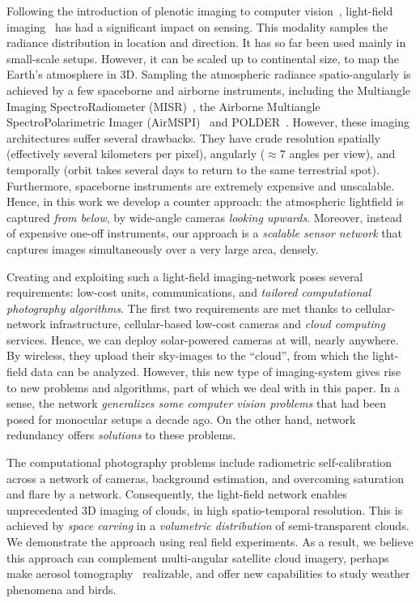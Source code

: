 \documentclass[runningheads]{llncs}
\begin{document}
Following the introduction of plenotic imaging to computer vision~\cite{Adelson1992}, light-field imaging~\cite{Basha2012,bishop,horstmeyer,Ng1948,kim} has had a significant impact on sensing. This modality samples the radiance distribution in location and direction. It has so far been used mainly in small-scale setups. However, it can be scaled up to continental size, to map the Earth's atmosphere in 3D. Sampling the atmospheric radiance spatio-angularly is achieved by a few spaceborne and airborne instruments, including the Multiangle Imaging SpectroRadiometer (MISR)~\cite{diner,Diner1998}, the Airborne Multiangle SpectroPolarimetric Imager (AirMSPI)~\cite{dinerDavis07,dinerDavis10} and POLDER~\cite{baxter,breon,vanMol}.
However, these imaging architectures suffer several drawbacks. They have crude resolution spatially (effectively several kilometers per pixel), angularly  ($\approx 7$ angles per view), and temporally (orbit takes several days to return to the same terrestrial spot). Furthermore, spaceborne instruments are extremely expensive and unscalable. Hence, in this work we develop a counter approach: the atmospheric lightfield is captured {\em from below}, by wide-angle cameras {\em looking upwards}. Moreover, instead of expensive one-off instruments, our approach is a {\em scalable sensor network} that captures images simultaneously over a very large area, densely.

Creating and exploiting such a light-field imaging-network poses several requirements: low-cost units,
communications, and {\em tailored computational photography algorithms}. The first two requirements are met  thanks to cellular-network infrastructure, cellular-based low-cost cameras and {\em cloud computing} services. Hence, we can deploy solar-powered cameras at will, nearly anywhere. By wireless, they upload their sky-images to the ``cloud'', from which the light-field data can be analyzed. However, this new type of imaging-system gives rise to new problems and algorithms, part of which we deal with in this paper. In a sense, the network {\em generalizes some computer vision problems} that had been posed for monocular setups a decade ago. On the other hand, network redundancy offers {\em solutions} to these problems.

The computational photography problems include radiometric self-calibration across a network of cameras, background estimation, and overcoming saturation and flare by a network. Consequently, the light-field network enables unprecedented 3D imaging of clouds, in high spatio-temporal resolution. This is achieved by {\em space carving} in a {\em volumetric distribution} of semi-transparent clouds. We demonstrate the approach using real field experiments. As a result, we believe this approach can complement multi-angular satellite cloud imagery, perhaps make aerosol tomography~\cite{Aides:13} realizable, and offer new capabilities to study weather phenomena and birds.
\end{document}
